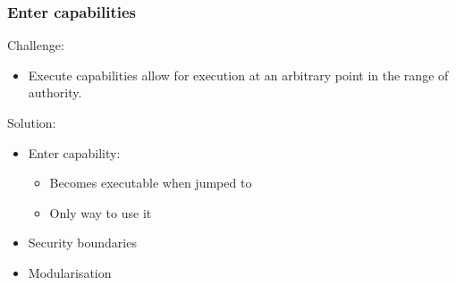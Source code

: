 \documentclass[handout]{beamer}
\begin{document}
\begin{frame}
  \frametitle{Enter capabilities}
  Challenge:
  \begin{itemize}
    \item Execute capabilities allow for execution at an arbitrary point in the range of authority.
  \end{itemize}
  Solution:
  \begin{itemize}
  \item Enter capability:
    \begin{itemize}
    \item Becomes executable when jumped to
    \item Only way to use it
    \end{itemize}
  \item Security boundaries
  \item Modularisation
  \end{itemize}
\end{frame}
\end{document}

